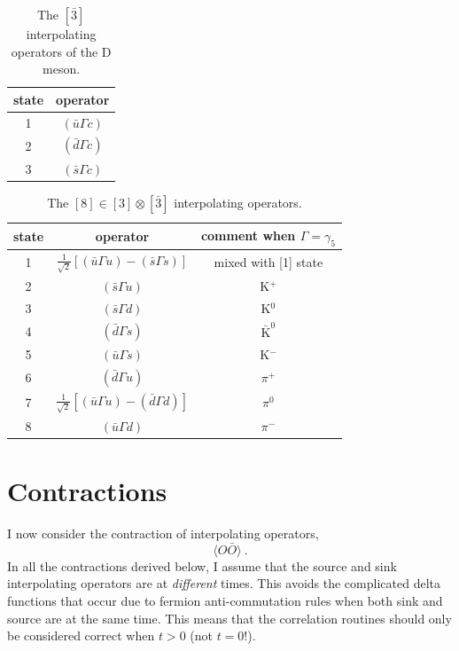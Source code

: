 \documentclass[11pt]{article}
\begin{document}
\begin{table}
\center
\caption{The $[\bar{3}]$ interpolating operators of the D meson. \label{tab:3b interp}}
\begin{tabular}{c|c}
state&operator\\
\hline\hline
1& $\left(\bar{u}\Gamma c\right)$\\
2& $\left(\bar{d}\Gamma c\right)$\\
3& $\left(\bar{s}\Gamma c\right)$\\
\hline\hline
\end{tabular}
\end{table}
\begin{table}
\center
\caption{The $[8]\in[3]\otimes[\bar{3}]$ interpolating operators. \label{tab:8 interp}}
\begin{tabular}{c|c|c}
state&operator&comment when $\Gamma=\gamma_5$\\
\hline\hline
1& $\frac{1}{\sqrt{2}}\left[\left(\bar{u}\Gamma u\right)-\left(\bar{s}\Gamma s\right)\right]$& mixed with [1] state \\
2& $\left(\bar{s}\Gamma u\right)$& K$^+$\\
3& $\left(\bar{s}\Gamma d\right)$& K$^0$ \\
4& $\left(\bar{d}\Gamma s\right)$&$\bar{\text{K}}^0$ \\
5& $\left(\bar{u}\Gamma s\right)$& K$^-$ \\
6& $\left(\bar{d}\Gamma u\right)$&$\pi^+$\\
7& $\frac{1}{\sqrt{2}}\left[\left(\bar{u}\Gamma u\right)-\left(\bar{d}\Gamma d\right)\right]$&$\pi^0$\\
8& $\left(\bar{u}\Gamma d\right)$&$\pi^-$\\
\hline\hline
\end{tabular}
\end{table}



\section{Contractions}
I now consider the contraction of interpolating operators,
\begin{displaymath}
\langle O\bar{O}\rangle\ .
\end{displaymath}
In all the contractions derived below, I assume that the source and sink interpolating operators are at \emph{different} times.  This avoids the complicated delta functions that occur due to fermion anti-commutation rules when both sink and source are at the same time.  This means that the correlation routines should only be considered correct when $t>0$ (not $t=0$!).
\end{document}
